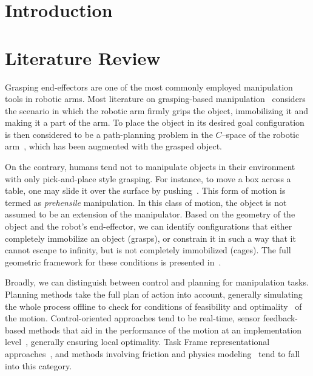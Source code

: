 \documentclass[runningheads,letterpaper]{llncs}
\begin{document}
\section{Introduction}


\section{Literature Review}
Grasping end-effectors are one of the most commonly employed manipulation tools in robotic arms. Most literature on grasping-based manipulation~\cite{prattichizzo2016grasping} considers the scenario in which the robotic arm firmly grips the object, immobilizing it and making it a part of the arm. To place the object in its desired goal configuration is then considered to be a path-planning problem in the $C$--space of the robotic arm~\cite{brock2008motion}, which has been augmented with the grasped object. 

On the contrary, humans tend not to manipulate objects in their environment with only pick-and-place style grasping. For instance, to move a box across a table, one may slide it over the surface by pushing~\cite{chavan2015prehensile}. This form of motion is termed as \textit{prehensile} manipulation. In this class of motion, the object is not assumed to be an extension of the manipulator. Based on the geometry of the object and the robot's end-effector, we can identify configurations that either completely immobilize an object (grasps), or constrain it in such a way that it cannot escape to infinity, but is not completely immobilized (cages). The full geometric framework for these conditions is presented in~\cite{rodriguez2012caging}.

Broadly, we can distinguish between control and planning for manipulation tasks. Planning methods take the full plan of action into account, generally simulating the whole process offline to check for conditions of feasibility and optimality~\cite{kavraki2016motion} of the motion. Control-oriented approaches tend to be real-time, sensor feedback-based methods that aid in the performance of the motion at an implementation level~\cite{dafle2014extrinsic}, generally ensuring local optimality. Task Frame representational approaches~\cite{prats2010framework}, and methods involving friction and physics modeling~\cite{chavan2015prehensile} tend to fall into this category.
\end{document}
